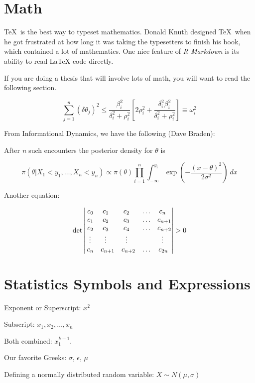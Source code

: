 \documentclass[12pt, twoside]{amherstthesis}
\begin{document}
\hypertarget{math}{%
\section{Math}\label{math}}

\TeX~is the best way to typeset mathematics. Donald Knuth designed \TeX~when he got frustrated at how long it was taking the typesetters to finish his book, which contained a lot of mathematics. One nice feature of \emph{R Markdown} is its ability to read LaTeX code directly.

If you are doing a thesis that will involve lots of math, you will want to read the following section.

\[
\sum_{j=1}^n (\delta\theta_j)^2 \leq 
\frac{\beta_i^2}{\delta_i^2 + \rho_i^2}
\left[ 2\rho_i^2 + \frac{\delta_i^2\beta_i^2}{\delta_i^2 + \rho_i^2} \right] \equiv \omega_i^2
\]

From Informational Dynamics, we have the following (Dave Braden):

After \emph{n} such encounters the posterior density for \(\theta\) is

\[
\pi(\theta|X_1< y_1,\dots,X_n<y_n) \varpropto \pi(\theta) \prod_{i=1}^n\int_{-\infty}^{y_i}
   \exp\left(-\frac{(x-\theta)^2}{2\sigma^2}\right)\ dx
\]

Another equation:

\[
\det\left|\,\begin{matrix}%
c_0&c_1\hfill&c_2\hfill&\ldots&c_n\hfill\cr
c_1&c_2\hfill&c_3\hfill&\ldots&c_{n+1}\hfill\cr
c_2&c_3\hfill&c_4\hfill&\ldots&c_{n+2}\hfill\cr
\,\vdots\hfill&\,\vdots\hfill&
  \,\vdots\hfill&&\,\vdots\hfill\cr
c_n&c_{n+1}\hfill&c_{n+2}\hfill&\ldots&c_{2n}\hfill\cr
\end{matrix}\right|>0
\]

\hypertarget{statistics-symbols-and-expressions}{%
\section{Statistics Symbols and Expressions}\label{statistics-symbols-and-expressions}}

\noindent Exponent or Superscript: \(x^2\)

\noindent Subscript: \(x_1, x_2, \dots, x_n\)

\noindent Both combined: \(x_1^{k+1}\).

\noindent Our favorite Greeks: \(\sigma\), \(\epsilon\), \(\mu\)

\noindent Defining a normally distributed random variable: \(X\sim N(\mu, \sigma)\)
\end{document}
